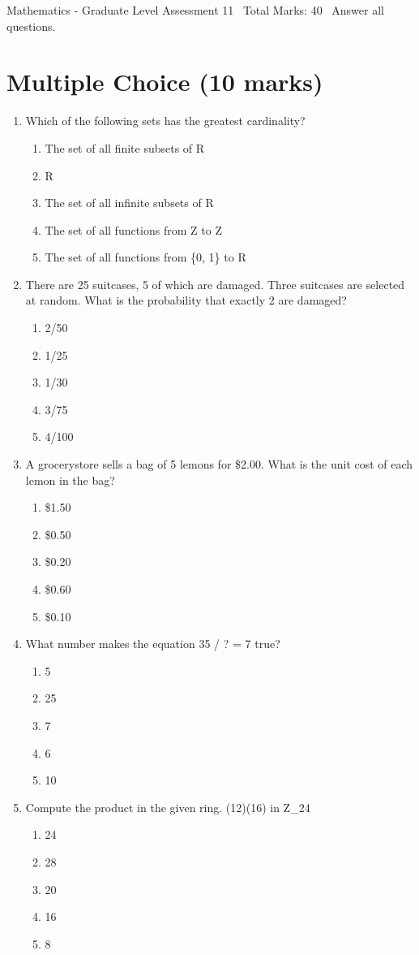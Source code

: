 \documentclass[12pt]{article}
\begin{document}
\begin{center}
Mathematics - Graduate Level Assessment 11 \
Total Marks: 40 \
Answer all questions.
\end{center}

\section*{Multiple Choice (10 marks)}
\begin{enumerate}[label=\arabic*.]
\item Which of the following sets has the greatest cardinality?
\begin{enumerate}[label=(\alph*)]
    \item The set of all finite subsets of R
    \item R
    \item The set of all infinite subsets of R
    \item The set of all functions from Z to Z
    \item The set of all functions from \{0, 1\} to R
\end{enumerate}
\item There are 25 suitcases, 5 of which are damaged. Three suitcases are selected at random. What is the probability that exactly 2 are damaged?
\begin{enumerate}[label=(\alph*)]
    \item 2/50
    \item 1/25
    \item 1/30
    \item 3/75
    \item 4/100
\end{enumerate}
\item A grocerystore sells a bag of 5 lemons for \$2.00. What is the unit cost of each lemon in the bag?
\begin{enumerate}[label=(\alph*)]
    \item \$1.50
    \item \$0.50
    \item \$0.20
    \item \$0.60
    \item \$0.10
\end{enumerate}
\item What number makes the equation 35 / ? = 7 true?
\begin{enumerate}[label=(\alph*)]
    \item 5
    \item 25
    \item 7
    \item 6
    \item 10
\end{enumerate}
\item Compute the product in the given ring. (12)(16) in Z\_24
\begin{enumerate}[label=(\alph*)]
    \item 24
    \item 28
    \item 20
    \item 16
    \item 8
\end{enumerate}
\end{enumerate}
\end{document}
